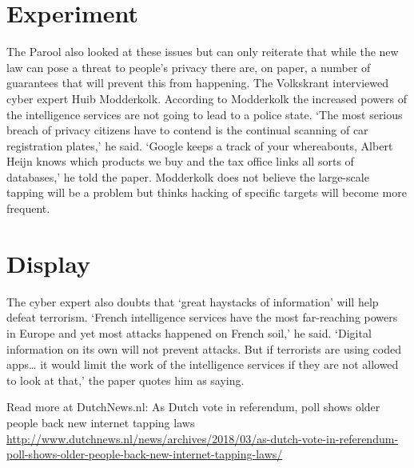 \documentclass[]{book}
\begin{document}
\hypertarget{experiment}{%
\chapter{Experiment}\label{experiment}}

The Parool also looked at these issues but can only reiterate that while
the new law can pose a threat to people's privacy there are, on paper, a
number of guarantees that will prevent this from happening. The
Volkskrant interviewed cyber expert Huib Modderkolk. According to
Modderkolk the increased powers of the intelligence services are not
going to lead to a police state. `The most serious breach of privacy
citizens have to contend is the continual scanning of car registration
plates,' he said. `Google keeps a track of your whereabouts, Albert
Heijn knows which products we buy and the tax office links all sorts of
databases,' he told the paper. Modderkolk does not believe the
large-scale tapping will be a problem but thinks hacking of specific
targets will become more frequent.

\hypertarget{display}{%
\chapter{Display}\label{display}}

The cyber expert also doubts that `great haystacks of information' will
help defeat terrorism. `French intelligence services have the most
far-reaching powers in Europe and yet most attacks happened on French
soil,' he said. `Digital information on its own will not prevent
attacks. But if terrorists are using coded apps\ldots{} it would limit
the work of the intelligence services if they are not allowed to look at
that,' the paper quotes him as saying.

Read more at DutchNews.nl: As Dutch vote in referendum, poll shows older
people back new internet tapping laws
\url{http://www.dutchnews.nl/news/archives/2018/03/as-dutch-vote-in-referendum-poll-shows-older-people-back-new-internet-tapping-laws/}
\end{document}
